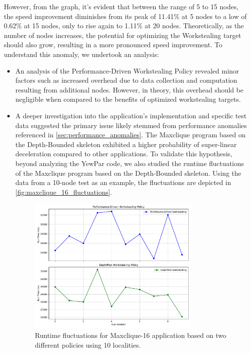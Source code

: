 \documentclass{mproj}
\begin{document}
However, from the graph, it's evident that between the range of 5 to 15 nodes,
the speed improvement diminishes from its peak of 11.41\% at 5 nodes to a low of 0.62\% at 15 nodes,
only to rise again to 1.11\% at 20 nodes.
Theoretically, as the number of nodes increases,
the potential for optimizing the Workstealing target should also grow,
resulting in a more pronounced speed improvement.
To understand this anomaly, we undertook an analysis:
\begin{itemize}
    \item An analysis of the Performance-Driven Workstealing Policy revealed minor factors such as increased overhead due to data collection and computation resulting from additional nodes.
          However, in theory, this overhead should be negligible when compared to the benefits of optimized workstealing targets.
    \item A deeper investigation into the application's implementation and specific test data suggested the primary issue likely stemmed from performance anomalies referenced in \cref{sec:performance_anomalies}.
          The Maxclique program based on the Depth-Bounded skeleton exhibited a higher probability of super-linear deceleration compared to other applications.
          To validate this hypothesis, beyond analyzing the YewPar code,
          we also studied the runtime fluctuations of the Maxclique program based on the Depth-Bounded skeleton.
          Using the data from a 10-node test as an example, the fluctuations are depicted in \cref{fig:maxclique_16_fluctuations}.
          \begin{figure}[h]
              \centering
              \includegraphics[width=0.8\textwidth]{images/maxclique_16_fluctuations.pdf}
              \caption{Runtime fluctuations for Maxclique-16 application based on two different policies using 10 localities.}

\end{figure}
\end{itemize}
\end{document}
